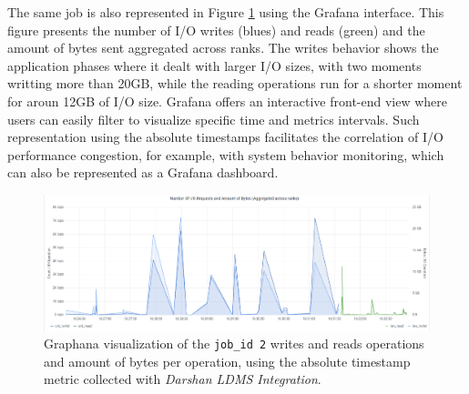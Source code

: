 The same job is also represented in Figure \ref{f:mpi_io_grafana}
using the Grafana interface. This figure presents the number of I/O
writes (blues) and reads (green) and the amount of bytes sent
aggregated across ranks. The writes behavior shows the application
phases where it dealt with larger I/O sizes, with two moments writting
more than 20GB, while the reading operations run for a shorter moment
for aroun 12GB of I/O size. Grafana offers an interactive front-end
view where users can easily filter to visualize specific time and
metrics intervals. Such representation using the absolute timestamps
facilitates the correlation of I/O performance congestion, for
example, with system behavior monitoring, which can also be
represented as a Grafana dashboard.

\begin{figure}[h!]
	\centering
	\includegraphics[width=\textwidth]{figs/255653_mpi_io_luster_no_coll.pdf}
	\caption{Graphana visualization of the \texttt{job\_id 2}
          writes and reads operations and amount of bytes per
          operation, using the absolute timestamp metric collected
          with \emph{Darshan LDMS Integration}.}
	\label{f:mpi_io_grafana}
      \end{figure}

